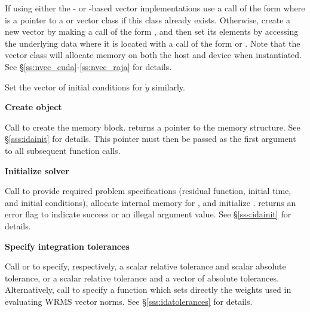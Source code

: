 \begin{Steps}
  If using either the {\cuda}- or {\raja}-based vector implementations
  use a call of the form
   where  is a pointer to a 
  or  vector class if this class already exists.  Otherwise,
  create a new vector
  by making a call of the form , and then set its
  elements by accessing the underlying data where it is located
  with a call of the form
   or .
  Note that the vector class will allocate memory on both the host and device
  when instantiated.  See \S\ref{ss:nvec_cuda}-\ref{ss:nvec_raja} for details.


  Set the vector  of initial conditions for $\dot{y}$ similarly.

\item\label{i:ida_create}
  {\bf Create {\idas} object}

  Call \id{()}
  to create the {\idas} memory block.
   returns a pointer to the {\idas} memory structure.
  See \S\ref{sss:idainit} for details.
  This  pointer must then be passed as the first argument
  to all subsequent {\idas} function calls.

\item\label{i:ida_init}
  {\bf Initialize {\idas} solver}

  Call  to provide required problem
  specifications (residual function, initial time, and initial conditions),
  allocate internal memory for {\idas}, and initialize {\idas}.
   returns an error flag to indicate success or an illegal argument
  value.  See \S\ref{sss:idainit} for details.

\item
  {\bf Specify integration tolerances}

  Call  or 
  to specify, respectively, a scalar relative tolerance and scalar
  absolute tolerance, or a scalar relative tolerance and a vector of
  absolute tolerances.  Alternatively, call  to
  specify a function which sets directly the weights used in
  evaluating WRMS vector norms.  See \S\ref{sss:idatolerances} for
  details.


\end{Steps}
